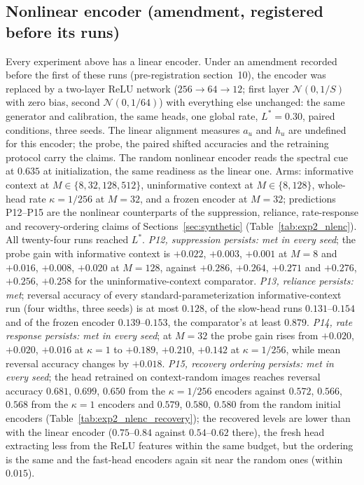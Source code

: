 \subsection{Nonlinear encoder (amendment, registered before its runs)}
Every experiment above has a linear encoder. Under an amendment recorded before the
first of these runs (pre-registration section~10), the encoder was replaced by a two-layer
ReLU network ($256\to64\to12$; first layer $\mathcal N(0,1/S)$ with zero bias, second
$\mathcal N(0,1/64)$) with everything else unchanged: the same generator and calibration,
the same heads, one global rate, $L^\ast=0.30$, paired conditions, three seeds. The linear
alignment measures $a_u$ and $h_u$ are undefined for this encoder; the probe, the paired
shifted accuracies and the retraining protocol carry the claims. The random nonlinear
encoder reads the spectral cue at $0.635$ at initialization, the same readiness as the
linear one. Arms: informative context at $M\in\{8,32,128,512\}$, uninformative context
at $M\in\{8,128\}$, whole-head rate $\kappa=1/256$ at $M=32$, and a frozen encoder at
$M=32$; predictions P12--P15 are the nonlinear counterparts of the suppression, reliance,
rate-response and recovery-ordering claims of Sections~\ref{sec:synthetic}
(Table~\ref{tab:exp2_nlenc}). All twenty-four runs reached $L^\ast$. \emph{P12, suppression
persists: met in every seed}; the probe gain with informative context is $+0.022$, $+0.003$,
$+0.001$ at $M=8$ and $+0.016$, $+0.008$, $+0.020$ at $M=128$, against $+0.286$, $+0.264$,
$+0.271$ and $+0.276$, $+0.256$, $+0.258$ for the uninformative-context comparator.
\emph{P13, reliance persists: met}; reversal accuracy of every standard-parameterization
informative-context run (four widths, three seeds) is at most $0.128$, of the slow-head runs
$0.131$--$0.154$ and of the frozen encoder $0.139$--$0.153$, the comparator's at least $0.879$. \emph{P14, rate response persists: met in
every seed}; at $M=32$ the probe gain rises from $+0.020$, $+0.020$, $+0.016$ at
$\kappa=1$ to $+0.189$, $+0.210$, $+0.142$ at $\kappa=1/256$, while mean reversal accuracy
changes by $+0.018$. \emph{P15, recovery ordering persists: met in every seed}; the head
retrained on context-random images reaches reversal accuracy $0.681$, $0.699$, $0.650$ from
the $\kappa=1/256$ encoders against $0.572$, $0.566$, $0.568$ from the $\kappa=1$ encoders and
$0.579$, $0.580$, $0.580$ from the random initial encoders (Table~\ref{tab:exp2_nlenc_recovery});
the recovered levels are lower than with the linear encoder ($0.75$--$0.84$ against
$0.54$--$0.62$ there), the fresh head extracting less from the ReLU features within the
same budget, but the ordering is the same and the fast-head encoders again sit near the random
ones (within $0.015$).

